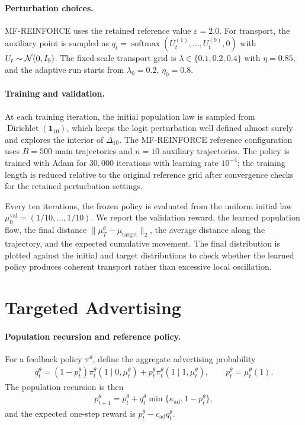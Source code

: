 \paragraph{Perturbation choices.}
MF-REINFORCE uses the retained reference value $\varepsilon=2.0$. For transport, the auxiliary point is sampled as $q_t=\operatorname{softmax}(U_t^{(1)},\ldots,U_t^{(9)},0)$ with $U_t\sim{\cal N}(0,I_9)$. The fixed-scale transport grid is $\lambda\in\{0.1,0.2,0.4\}$ with $\eta=0.85$, and the adaptive run starts from $\lambda_0=0.2$, $\eta_0=0.8$.

\paragraph{Training and validation.}
At each training iteration, the initial population law is sampled from $\operatorname{Dirichlet}(\mathbf 1_{10})$, which keeps the logit perturbation well defined almost surely and explores the interior of $\Delta_{10}$. The MF-REINFORCE reference configuration uses $B=500$ main trajectories and $n=10$ auxiliary trajectories. The policy is trained with Adam for $30{,}000$ iterations with learning rate $10^{-4}$; the training length is reduced relative to the original reference grid after convergence checks for the retained perturbation settings.

Every ten iterations, the frozen policy is evaluated from the uniform initial law $\mu_0^{\mathrm{val}}=(1/10,\ldots,1/10)$. We report the validation reward, the learned population flow, the final distance $\|\mu_T^\theta-\mu_{\mathrm{target}}\|_2$, the average distance along the trajectory, and the expected cumulative movement. The final distribution is plotted against the initial and target distributions to check whether the learned policy produces coherent transport rather than excessive local oscillation.

\section{Targeted Advertising}
\label{appendix:spec-advertising}

\paragraph{Population recursion and reference policy.}
For a feedback policy $\pi^\theta$, define the aggregate advertising probability
\begin{align}
    q_t^\theta
    =
    (1-p_t^\theta)\pi_t^\theta(1\mid0,\mu_t^\theta)
    +
    p_t^\theta\pi_t^\theta(1\mid1,\mu_t^\theta),
    \qquad
    p_t^\theta=\mu_t^\theta(1).
\end{align}
The population recursion is then
\begin{align}
    p_{t+1}^\theta
    =
    p_t^\theta
    +
    q_t^\theta\min\{\kappa_{\mathrm{ad}},1-p_t^\theta\},
    \label{eq:advertising-population-recursion}
\end{align}
and the expected one-step reward is $p_t^\theta-c_{\mathrm{ad}}q_t^\theta$.

